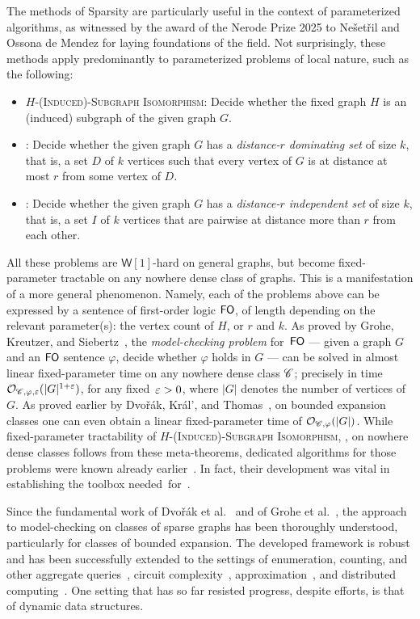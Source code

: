 The methods of Sparsity are particularly useful in the context of parameterized algorithms, as witnessed by the award of the Nerode Prize 2025 to Ne\v{s}et\v{r}il and Ossona de Mendez for laying foundations of the field. Not surprisingly, these methods apply predominantly to parameterized problems of local nature, such as the following:
\begin{itemize}
	\item \textsc{$H$-(Induced)-Subgraph Isomorphism}: Decide whether the fixed graph $H$ is an (induced) subgraph of the given graph $G$.
	\item {}: Decide whether the given graph $G$ has a \emph{distance-$r$ dominating set} of size $k$, that is, a set $D$ of $k$ vertices such that every vertex of $G$ is at distance at most $r$ from some vertex of $D$.
	\item {}: Decide whether the given graph $G$ has a \emph{distance-$r$ independent set} of size $k$, that is, a set $I$ of $k$ vertices that are pairwise at distance more than $r$ from each other.
\end{itemize}
All these problems are $\mathsf{W}[1]$-hard on general graphs, but become fixed-parameter tractable on any nowhere dense class of graphs. This is a manifestation of a more general phenomenon. Namely, each of the problems above can be expressed by a sentence of first-order logic $\mathsf{FO}$, of length depending on the relevant parameter(s): the vertex count of $H$, or $r$ and $k$. As proved by Grohe, Kreutzer, and Siebertz~\cite{GroheKS17}, the \emph{model-checking problem} for~$\mathsf{FO}$ --- given a graph $G$ and an $\mathsf{FO}$ sentence $\varphi$, decide whether $\varphi$ holds in $G$ ---  can be solved in almost linear fixed-parameter time on any nowhere dense class $\mathscr C$; precisely in time $\mathcal{O}_{\mathscr C,\varphi,\varepsilon}(|G|^{1+\varepsilon})$, for any fixed~$\varepsilon>0$, where $|G|$ denotes the number of vertices of $G$. As proved earlier by Dvo\v{r}\'ak, Kr\'al', and Thomas~\cite{DvorakKT13}, on bounded expansion classes one can even obtain a linear fixed-parameter time of $\mathcal{O}_{\mathscr C,\varphi}(|G|)$. While fixed-parameter tractability of \textsc{$H$-(Induced)-Subgraph Isomorphism}, ,  on nowhere dense classes follows from these meta-theorems, dedicated algorithms for those problems were known already earlier~\cite{DawarK09,NesetrilM08a}. In fact, their development was vital in establishing the toolbox needed~for~\cite{DvorakKT13,GroheKS17}.

Since the fundamental work of Dvo\v{r}\'ak et al.~\cite{DvorakKT13} and of Grohe et al.~\cite{GroheKS17}, the approach to model-checking on classes of sparse graphs has been thoroughly understood, particularly for classes of bounded expansion. The developed framework is robust and has been successfully extended to the settings of enumeration, counting, and other aggregate queries~\cite{GroheS18,KazanaS19,SchweikardtSV22,Torunczyk20}, circuit complexity~\cite{PilipczukST18}, approximation~\cite{Dvorak22}, and distributed computing~\cite{BlinFFGGMRT26}. One setting that has so far resisted progress, despite efforts, is that of dynamic data structures. 

